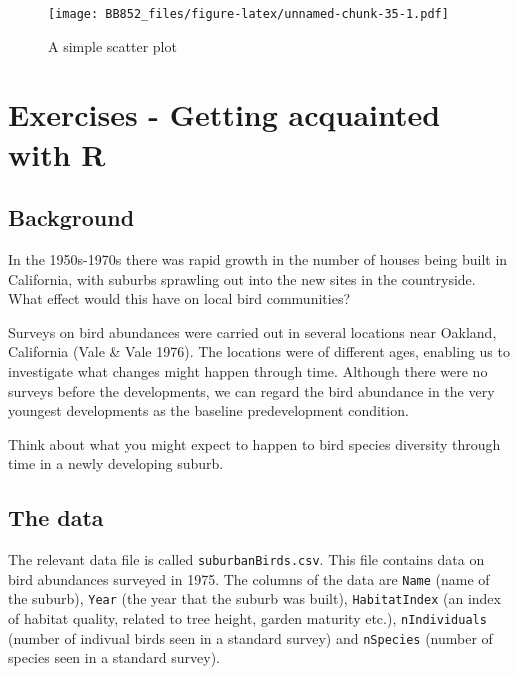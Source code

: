 \documentclass[
  a4paperpaper,
]{book}
\newenvironment{Shaded}{\begin{snugshade}}{\end{snugshade}}
\newcommand{\KeywordTok}[1]{\textcolor[rgb]{0.13,0.29,0.53}{\textbf{#1}}}
\newcommand{\NormalTok}[1]{#1}
\newcommand{\OperatorTok}[1]{\textcolor[rgb]{0.81,0.36,0.00}{\textbf{#1}}}
\begin{document}
\begin{Shaded}
\end{Shaded}

\begin{figure}
\centering
\texttt{[image: BB852\_files/figure-latex/unnamed-chunk-35-1.pdf]}
\caption{\label{fig:unnamed-chunk-35}A simple scatter plot}
\end{figure}

\hypertarget{exercises---getting-acquainted-with-r}{%
\section{Exercises - Getting acquainted with R}\label{exercises---getting-acquainted-with-r}}

\hypertarget{background}{%
\subsection{Background}\label{background}}

In the 1950s-1970s there was rapid growth in the number of houses being built in California, with suburbs sprawling out into the new sites in the countryside. What effect would this have on local bird communities?

Surveys on bird abundances were carried out in several locations near Oakland, California (Vale \& Vale 1976). The locations were of different ages, enabling us to investigate what changes might happen through time. Although there were no surveys before the developments, we can regard the bird abundance in the very youngest developments as the baseline predevelopment condition.

Think about what you might expect to happen to bird species diversity through time in a newly developing suburb.

\hypertarget{the-data}{%
\subsection{The data}\label{the-data}}

The relevant data file is called \texttt{suburbanBirds.csv}. This file contains data on bird abundances surveyed in 1975. The columns of the data are \texttt{Name} (name of the suburb), \texttt{Year} (the year that the suburb was built), \texttt{HabitatIndex} (an index of habitat quality, related to tree height, garden maturity etc.), \texttt{nIndividuals} (number of indivual birds seen in a standard survey) and \texttt{nSpecies} (number of species seen in a standard survey).
\end{document}
